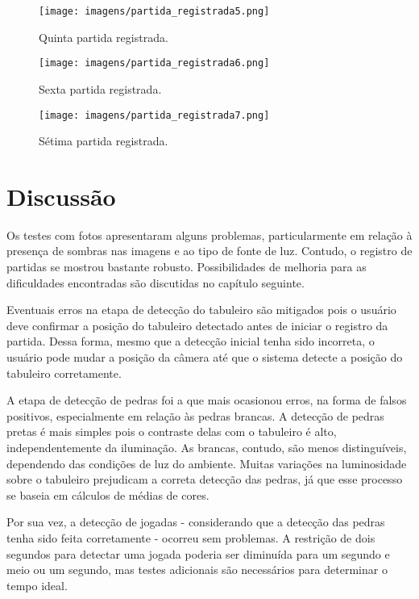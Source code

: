 \begin{figure}[htb!]
\centering
\begin{minipage}{.49\textwidth}
  \texttt{[image: imagens/partida\_registrada5.png]}
  \centering
  \caption{Quinta partida registrada.}
  \label{fig:partida5}
\end{minipage}
\begin{minipage}{.5\textwidth}
  \texttt{[image: imagens/partida\_registrada6.png]}
  \centering
  \caption{Sexta partida registrada.}
  \label{fig:partida6}
\end{minipage}
\end{figure}

\begin{figure}[htb!]
\centering
\texttt{[image: imagens/partida\_registrada7.png]}
\centering
\caption{Sétima partida registrada.}
\label{fig:partida7}
\end{figure}

\section{Discussão}

Os testes com fotos apresentaram alguns problemas, particularmente em relação à presença de sombras nas imagens e ao tipo de fonte de luz. Contudo, o registro de partidas se mostrou bastante robusto. Possibilidades de melhoria para as dificuldades encontradas são discutidas no capítulo seguinte.

Eventuais erros na etapa de detecção do tabuleiro são mitigados pois o usuário deve confirmar a posição do tabuleiro detectado antes de iniciar o registro da partida. Dessa forma, mesmo que a detecção inicial tenha sido incorreta, o usuário pode mudar a posição da câmera até que o sistema detecte a posição do tabuleiro corretamente.

A etapa de detecção de pedras foi a que mais ocasionou erros, na forma de falsos positivos, especialmente em relação às pedras brancas. A detecção de pedras pretas é mais simples pois o contraste delas com o tabuleiro é alto, independentemente da iluminação. As brancas, contudo, são menos distinguíveis, dependendo das condições de luz do ambiente. Muitas variações na luminosidade sobre o tabuleiro prejudicam a correta detecção das pedras, já que esse processo se baseia em cálculos de médias de cores. %

Por sua vez, a detecção de jogadas - considerando que a detecção das pedras tenha sido feita corretamente - ocorreu sem problemas. A restrição de dois segundos para detectar uma jogada poderia ser diminuída para um segundo e meio ou um segundo, mas testes adicionais são necessários para determinar o tempo ideal.

